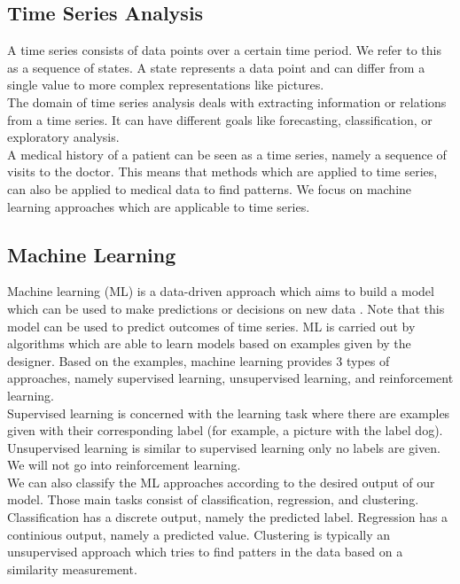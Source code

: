 	\subsection{Time Series Analysis}
A time series consists of data points over a certain time period. We refer to this as a sequence of states. A state represents a data point and can differ from a single value to more complex representations like pictures. \\
The domain of time series analysis deals with extracting information or relations from a time series. It can have different goals like forecasting, classification, or exploratory analysis. \\

A medical history of a patient can be seen as a time series, namely a sequence of visits to the doctor. This means that methods which are applied to time series, can also be applied to medical data to find patterns. We focus on machine learning approaches which are applicable to time series.

	\subsection{Machine Learning}
Machine learning (ML) is a data-driven approach which aims to build a model which can be used to make predictions or decisions on new data \cite{ML:article}. Note that this model can be used to predict outcomes of time series. ML is carried out by algorithms which are able to learn models based on examples given by the designer. Based on the examples, machine learning provides $3$ types of approaches, namely supervised learning, unsupervised learning, and reinforcement learning. \\
Supervised learning is concerned with the learning task where there are examples given with their corresponding label (for example, a picture with the label dog). Unsupervised learning is similar to supervised learning only no labels are given. We will not go into reinforcement learning. \\
We can also classify the ML approaches according to the desired output of our model. Those main tasks consist of classification, regression, and clustering. Classification has a discrete output, namely the predicted label. Regression has a continious output, namely a predicted value. Clustering is typically an unsupervised approach which tries to find patters in the data based on a similarity measurement. \\
	
